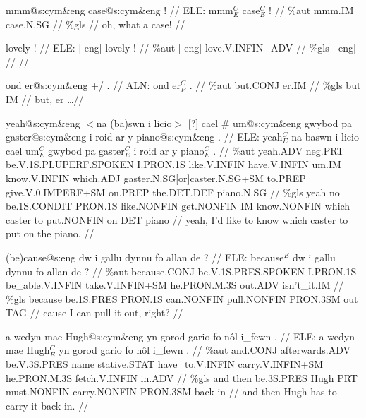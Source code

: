 \documentclass[a4paper,10pt]{article}
\begin{document}
\ex
\begingl[lingstyle=gergl]
\glchat mmm@s:cym\&eng case@s:cym\&eng ! //
\glsurface ELE:  mmm$^{C}_{E}$ case$^{C}_{E}$ !  //
\glauto \%aut  mmm{\scriptsize .IM} case{\scriptsize .N.SG}   //
\glmanual \%gls      //
\gleng oh, what a case! //
\endgl
\xe

\ex
\begingl[lingstyle=gergl]
\glchat lovely ! //
\glsurface ELE: [-eng] lovely !  //
\glauto \%aut [-eng] love{\scriptsize .V.INFIN+ADV}   //
\glmanual \%gls [-eng]    //
\gleng  //
\endgl
\xe

\ex
\begingl[lingstyle=gergl]
\glchat ond er@s:cym\&eng +/ . //
\glsurface ALN:  ond er$^{C}_{E}$ .  //
\glauto \%aut  but{\scriptsize .CONJ} er{\scriptsize .IM}   //
\glmanual \%gls  but IM   //
\gleng but, er \dots  //
\endgl
\xe

\ex
\begingl[lingstyle=gergl]
\glchat yeah@s:cym\&eng $<$na (ba)swn i licio$>$ [?] cael \# um@s:cym\&eng gwybod pa gaster@s:cym\&eng i roid ar y piano@s:cym\&eng . //
\glsurface ELE:  yeah$^{C}_{E}$ na baswn i licio cael um$^{C}_{E}$ gwybod pa gaster$^{C}_{E}$ i roid ar y piano$^{C}_{E}$ .  //
\glauto \%aut  yeah{\scriptsize .ADV} neg{\scriptsize .PRT} be{\scriptsize .V.1S.PLUPERF.SPOKEN} I{\scriptsize .PRON.1S} like{\scriptsize .V.INFIN} have{\scriptsize .V.INFIN} um{\scriptsize .IM} know{\scriptsize .V.INFIN} which{\scriptsize .ADJ} gaster{\scriptsize .N.SG[or]caster.N.SG+SM} to{\scriptsize .PREP} give{\scriptsize .V.0.IMPERF+SM} on{\scriptsize .PREP} the{\scriptsize .DET.DEF} piano{\scriptsize .N.SG}   //
\glmanual \%gls  yeah no be{\scriptsize .1S.CONDIT} PRON{\scriptsize .1S} like{\scriptsize .NONFIN} get{\scriptsize .NONFIN} IM know{\scriptsize .NONFIN} which caster to put{\scriptsize .NONFIN} on DET piano   //
\gleng yeah, I'd like to know which caster to put on the piano. //
\endgl
\xe

\ex
\begingl[lingstyle=gergl]
\glchat (be)cause@s:eng dw i gallu dynnu fo allan de ? //
\glsurface ELE:  because$^{E}$ dw i gallu dynnu fo allan de ?  //
\glauto \%aut  because{\scriptsize .CONJ} be{\scriptsize .V.1S.PRES.SPOKEN} I{\scriptsize .PRON.1S} be\_able{\scriptsize .V.INFIN} take{\scriptsize .V.INFIN+SM} he{\scriptsize .PRON.M.3S} out{\scriptsize .ADV} isn't\_it{\scriptsize .IM}   //
\glmanual \%gls  because be{\scriptsize .1S.PRES} PRON{\scriptsize .1S} can{\scriptsize .NONFIN} pull{\scriptsize .NONFIN} PRON{\scriptsize .3SM} out TAG   //
\gleng cause I can pull it out, right? //
\endgl
\xe

\ex
\begingl[lingstyle=gergl]
\glchat a wedyn mae Hugh@s:cym\&eng yn gorod gario fo nôl i\_fewn . //
\glsurface ELE:  a wedyn mae Hugh$^{C}_{E}$ yn gorod gario fo nôl i\_fewn .  //
\glauto \%aut  and{\scriptsize .CONJ} afterwards{\scriptsize .ADV} be{\scriptsize .V.3S.PRES} name stative{\scriptsize .STAT} have\_to{\scriptsize .V.INFIN} carry{\scriptsize .V.INFIN+SM} he{\scriptsize .PRON.M.3S} fetch{\scriptsize .V.INFIN} in{\scriptsize .ADV}   //
\glmanual \%gls  and then be{\scriptsize .3S.PRES} Hugh PRT must{\scriptsize .NONFIN} carry{\scriptsize .NONFIN} PRON{\scriptsize .3SM} back in   //
\gleng and then Hugh has to carry it back in. //
\endgl
\xe
\end{document}
